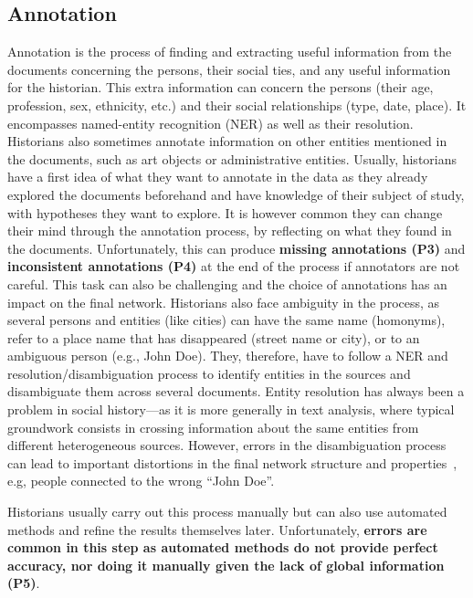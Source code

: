 \subsection{Annotation}
Annotation is the process of finding and extracting useful information from the documents concerning the persons, their social ties, and any useful information for the historian.
This extra information can concern the persons (their age, profession, sex, ethnicity, etc.) and their social relationships (type, date, place).
It encompasses named-entity recognition (NER) as well as their resolution.
Historians also sometimes annotate information on other entities mentioned in the documents, such as art objects or administrative entities.
Usually, historians have a first idea of what they want to annotate in the data as they already explored the documents beforehand and have knowledge of their subject of study, with hypotheses they want to explore.
It is however common they can change their mind through the annotation process, by reflecting on what they found in the documents.
Unfortunately, this can produce \textbf{missing annotations (P3)} and \textbf{inconsistent annotations (P4)} at the end of the process if annotators are not careful.
This task can also be challenging and the choice of annotations has an impact on the final network.
Historians also face ambiguity in the process, as several persons and entities (like cities) can have the same name (homonyms), refer to a place name that has disappeared (street name or city), or to an ambiguous person (e.g., John Doe).
They, therefore, have to follow a NER and resolution/disambiguation process to identify entities in the sources and disambiguate them across several documents.
Entity resolution has always been a problem in social history---as it is more generally in text analysis, where typical groundwork consists in crossing information about the same entities from different heterogeneous sources.
However, errors in the disambiguation process can lead to important distortions in the final network structure and properties~\cite{diesnerImpactEntityDisambiguation2015}, e.g, people connected to the wrong ``John Doe''.

Historians usually carry out this process manually but can also use automated methods and refine the results themselves later.
Unfortunately, \textbf{errors are common in this step as automated methods do not provide perfect accuracy, nor doing it manually given the lack of global information (P5)}.

